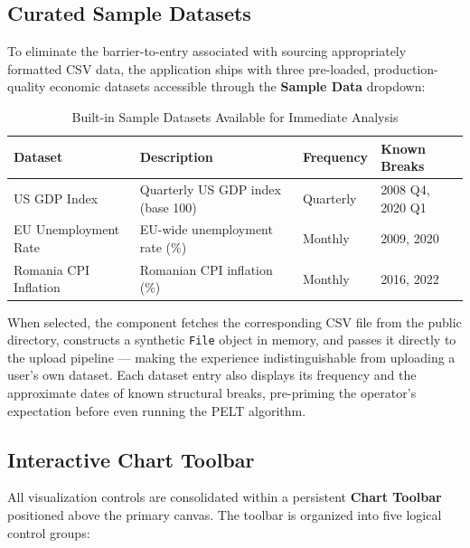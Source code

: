 \subsection{Curated Sample Datasets}
To eliminate the barrier-to-entry associated with sourcing appropriately formatted CSV data, the application ships with three pre-loaded, production-quality economic datasets accessible through the \textbf{Sample Data} dropdown:

\begin{table}[H]
    \centering
    \caption{Built-in Sample Datasets Available for Immediate Analysis}
    \label{tab:sample_datasets}
    \vspace{0.2cm}
    \begin{tabular}{@{}llll@{}}
        \toprule
        \textbf{Dataset} & \textbf{Description} & \textbf{Frequency} & \textbf{Known Breaks} \\
        \midrule
        US GDP Index & Quarterly US GDP index (base 100) & Quarterly & 2008 Q4, 2020 Q1 \\
        EU Unemployment Rate & EU-wide unemployment rate (\%) & Monthly & 2009, 2020 \\
        Romania CPI Inflation & Romanian CPI inflation (\%) & Monthly & 2016, 2022 \\
        \bottomrule
    \end{tabular}
\end{table}

When selected, the component fetches the corresponding CSV file from the public directory, constructs a synthetic \texttt{File} object in memory, and passes it directly to the upload pipeline — making the experience indistinguishable from uploading a user's own dataset. Each dataset entry also displays its frequency and the approximate dates of known structural breaks, pre-priming the operator's expectation before even running the PELT algorithm.

\subsection{Interactive Chart Toolbar}
All visualization controls are consolidated within a persistent \textbf{Chart Toolbar} positioned above the primary canvas. The toolbar is organized into five logical control groups:

